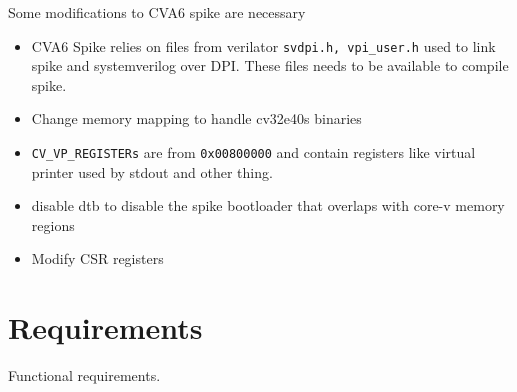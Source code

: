 Some modifications to CVA6 spike are necessary
\begin{itemize}
    \item CVA6 Spike relies on files from verilator \lstinline{svdpi.h, vpi_user.h} used to link spike and systemverilog over DPI. These files needs to be available to compile spike.
    \item Change memory mapping to handle cv32e40s binaries 
    \item \lstinline{CV_VP_REGISTERs} are from \lstinline{0x00800000} and contain registers like virtual printer used by stdout and other thing.
    \item  disable dtb to disable the spike bootloader that overlaps with core-v memory regions
    \item Modify CSR registers
\end{itemize}


\section{Requirements}

Functional requirements. 

